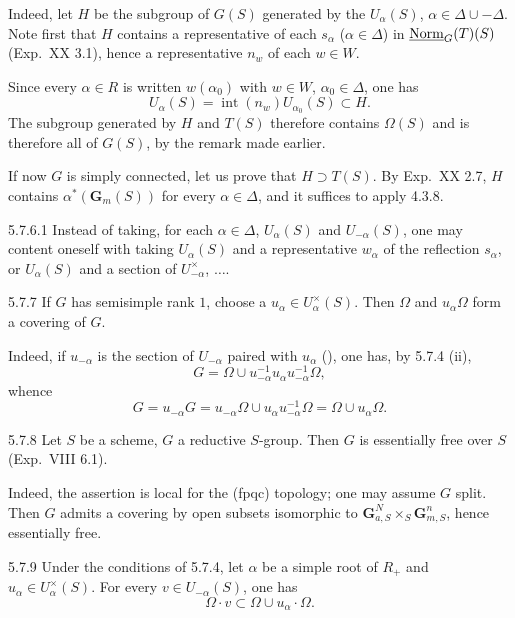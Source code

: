 Indeed, let $H$ be the subgroup of $G(S)$ generated by the $U_\alpha(S)$, $\alpha\in\Delta\cup-\Delta$. Note first that $H$ contains a representative of each $s_\alpha$ ($\alpha\in\Delta$) in $\underline{\mathrm{Norm}}_G(T)(S)$ (Exp.~XX 3.1), hence a representative $n_w$ of each $w\in W$.

Since every $\alpha\in R$ is written $w(\alpha_0)$ with $w\in W$, $\alpha_0\in\Delta$, one has
\[
U_\alpha(S)=\operatorname{int}(n_w)U_{\alpha_0}(S)\subset H.
\]
The subgroup generated by $H$ and $T(S)$ therefore contains $\Omega(S)$ and is therefore all of $G(S)$, by the remark made earlier.

If now $G$ is simply connected, let us prove that $H\supset T(S)$. By Exp.~XX 2.7, $H$ contains $\alpha^*(\mathbf G_m(S))$ for every $\alpha\in\Delta$, and it suffices to apply 4.3.8.
\begin{remark}{5.7.6.1}\label{XXII.5.7.6.1}
Instead of taking, for each $\alpha\in\Delta$, $U_\alpha(S)$ and $U_{-\alpha}(S)$, one may content oneself with taking $U_\alpha(S)$ and a representative $w_\alpha$ of the reflection $s_\alpha$, or $U_\alpha(S)$ and a section of $U_{-\alpha}^\times$, $\ldots$.
\end{remark}
\begin{corollary}{5.7.7}\label{XXII.5.7.7}
If $G$ has semisimple rank $1$, choose a $u_\alpha\in U_\alpha^\times(S)$. Then $\Omega$ and $u_\alpha\Omega$ form a covering of $G$.
\end{corollary}
Indeed, if $u_{-\alpha}$ is the section of $U_{-\alpha}$ paired with $u_\alpha$ (), one has, by 5.7.4 (ii),
\[
G=\Omega\cup u_{-\alpha}^{-1}u_\alpha u_{-\alpha}^{-1}\Omega,
\]
whence
\[
G=u_{-\alpha}G=u_{-\alpha}\Omega\cup u_\alpha u_{-\alpha}^{-1}\Omega=\Omega\cup u_\alpha\Omega.
\]
\begin{corollary}{5.7.8}\label{XXII.5.7.8}
Let $S$ be a scheme, $G$ a reductive $S$-group. Then $G$ is essentially free over $S$ (Exp.~VIII 6.1).{\renewcommand{\thefootnote}{(47)}}
\end{corollary}
Indeed, the assertion is local for the (fpqc) topology; one may assume $G$ split. Then $G$ admits a covering by open subsets isomorphic to $\mathbf G_{a,S}^N\times_S\mathbf G_{m,S}^n$, hence essentially free.
\begin{lemma}{5.7.9}\label{XXII.5.7.9}
Under the conditions of 5.7.4, let $\alpha$ be a simple root of $R_+$ and $u_\alpha\in U_\alpha^\times(S)$. For every $v\in U_{-\alpha}(S)$, one has
\[
\Omega\cdot v\subset\Omega\cup u_\alpha\cdot\Omega.
\]
\end{lemma}
